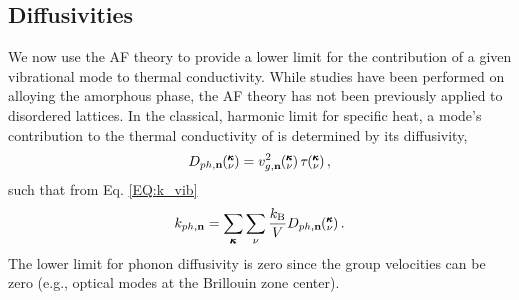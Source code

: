 \subsection{\label{S:Diffusivities}
Diffusivities}

We now use the AF theory to provide a lower limit for the contribution  
of a given vibrational mode to thermal conductivity. 
While studies have been performed on alloying the amorphous phase,
\cite{feldman_thermal_1993} the 
AF theory has not been previously applied to disordered lattices. In the 
classical, harmonic limit for specific heat, a mode's contribution to the 
thermal conductivity of is determined by its diffusivity, 
\begin{equation}\label{EQ:Dph}
D_{ph,\mathbf{n}}\kv = v^2_{g,\mathbf{n}}\kv \tau\kv, 
\end{equation}
such that from Eq. \eqref{EQ:k_vib} 
\begin{equation}\label{EQ:k_Dph}
k_{ph,\mathbf{n}} = \sum_{\pmb{\kappa}} \sum_{\nu} 
\frac{k_{\text{B}}}{V} D_{ph,\mathbf{n}}\mspace{-4.0mu}\left(\mspace{-8.0mu} \begin{smallmatrix}&\pmb{\kappa} \\&\nu \end{smallmatrix}\mspace{-3.0mu}\right).
\end{equation} The lower limit for phonon diffusivity is 
zero since the group velocities can be zero (e.g., optical modes at the 
Brillouin zone center). 

